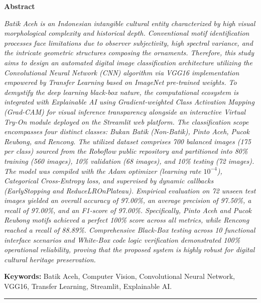 \documentclass[10pt,a4paper]{article}
\begin{document}
{\fontsize{13pt}{15pt}\bfseries Abstract\par}
\vspace{3pt}

{\fontsize{9.5pt}{12pt}\selectfont
\textit{Batik Aceh is an Indonesian intangible cultural entity characterized by high visual morphological complexity and historical depth. Conventional motif identification processes face limitations due to observer subjectivity, high spectral variance, and the intricate geometric structures composing the ornaments. Therefore, this study aims to design an automated digital image classification architecture utilizing the Convolutional Neural Network (CNN) algorithm via VGG16 implementation empowered by Transfer Learning based on ImageNet pre-trained weights. To demystify the deep learning black-box nature, the computational ecosystem is integrated with Explainable AI using Gradient-weighted Class Activation Mapping (Grad-CAM) for visual inference transparency alongside an interactive Virtual Try-On module deployed on the Streamlit web platform. The classification scope encompasses four distinct classes: Bukan Batik (Non-Batik), Pinto Aceh, Pucok Reubong, and Rencong. The utilized dataset comprises 700 balanced images (175 per class) sourced from the Roboflow public repository and partitioned into 80\% training (560 images), 10\% validation (68 images), and 10\% testing (72 images). The model was compiled with the Adam optimizer (learning rate $10^{-4}$), Categorical Cross-Entropy loss, and supervised by dynamic callbacks (EarlyStopping and ReduceLROnPlateau). Empirical evaluation on 72 unseen test images yielded an overall accuracy of 97.00\%, an average precision of 97.50\%, a recall of 97.00\%, and an F1-score of 97.00\%. Specifically, Pinto Aceh and Pucok Reubong motifs achieved a perfect 100\% score across all metrics, while Rencong reached a recall of 88.89\%. Comprehensive Black-Box testing across 10 functional interface scenarios and White-Box code logic verification demonstrated 100\% operational reliability, proving that the proposed system is highly robust for digital cultural heritage preservation.}\par}

\vspace{4pt}
{\fontsize{9.5pt}{12pt}\selectfont\textbf{Keywords:} Batik Aceh, Computer Vision, Convolutional Neural Network, VGG16, Transfer Learning, Streamlit, Explainable AI.\par}

\vspace{3pt}
\noindent\rule{\textwidth}{0.4pt}
\vspace{4pt}
\end{document}
